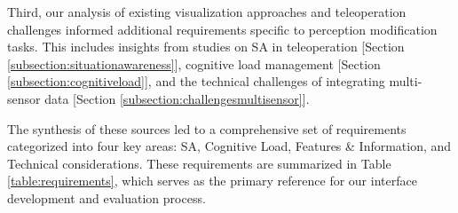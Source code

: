 Third, our analysis of existing visualization approaches and teleoperation challenges informed additional requirements specific to perception modification tasks. This includes insights from studies on \ac{SA} in teleoperation [Section \ref{subsection:situationawareness}], cognitive load management [Section \ref{subsection:cognitiveload}], and the technical challenges of integrating multi-sensor data [Section \ref{subsection:challengesmultisensor}].

The synthesis of these sources led to a comprehensive set of requirements categorized into four key areas: \ac{SA}, Cognitive Load, Features \& Information, and Technical considerations. These requirements are summarized in Table \ref{table:requirements}, which serves as the primary reference for our interface development and evaluation process.

